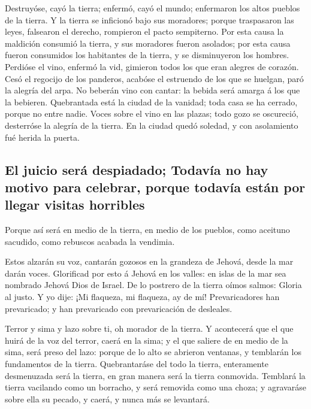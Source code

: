  Destruyóse, cayó la tierra; enfermó, cayó el mundo;
enfermaron los altos pueblos de la tierra.  Y la tierra se
inficionó bajo sus moradores; porque traspasaron las leyes, falsearon el
derecho, rompieron el pacto sempiterno.  Por esta causa la
maldición consumió la tierra, y sus moradores fueron asolados; por esta
causa fueron consumidos los habitantes de la tierra, y se disminuyeron
los hombres.  Perdióse el vino, enfermó la vid, gimieron
todos los que eran alegres de corazón.  Cesó el regocijo de
los panderos, acabóse el estruendo de los que se huelgan, paró la
alegría del arpa.  No beberán vino con cantar: la bebida
será amarga á los que la bebieren.  Quebrantada está la
ciudad de la vanidad; toda casa se ha cerrado, porque no entre nadie.
 Voces sobre el vino en las plazas; todo gozo se oscureció,
desterróse la alegría de la tierra.  En la ciudad quedó
soledad, y con asolamiento fué herida la puerta.

\hypertarget{el-juicio-seruxe1-despiadado-todavuxeda-no-hay-motivo-para-celebrar-porque-todavuxeda-estuxe1n-por-llegar-visitas-horribles}{%
\subsection{El juicio será despiadado; Todavía no hay motivo para
celebrar, porque todavía están por llegar visitas
horribles}\label{el-juicio-seruxe1-despiadado-todavuxeda-no-hay-motivo-para-celebrar-porque-todavuxeda-estuxe1n-por-llegar-visitas-horribles}}

 Porque así será en medio de la tierra, en medio de los
pueblos, como aceituno sacudido, como rebuscos acabada la vendimia.

 Estos alzarán su voz, cantarán gozosos en la grandeza de
Jehová, desde la mar darán voces.  Glorificad por esto á
Jehová en los valles: en islas de la mar sea nombrado Jehová Dios de
Israel.  De lo postrero de la tierra oímos salmos: Gloria
al justo. Y yo dije: ¡Mi flaqueza, mi flaqueza, ay de mí! Prevaricadores
han prevaricado; y han prevaricado con prevaricación de desleales.

 Terror y sima y lazo sobre ti, oh morador de la tierra.
 Y acontecerá que el que huirá de la voz del terror, caerá
en la sima; y el que saliere de en medio de la sima, será preso del
lazo: porque de lo alto se abrieron ventanas, y temblarán los
fundamentos de la tierra.  Quebrantaráse del todo la
tierra, enteramente desmenuzada será la tierra, en gran manera será la
tierra conmovida.  Temblará la tierra vacilando como un
borracho, y será removida como una choza; y agravaráse sobre ella su
pecado, y caerá, y nunca más se levantará.

